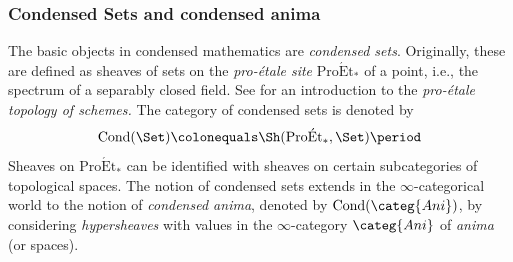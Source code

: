\documentclass[leqno]{article}
\newcommand{\Ani}{\categ{Ani}}
\DeclareMathOperator{\Cond}{Cond}
\newcommand{\CondAni}{\Cond(\Ani)}
\newcommand{\CondSet}{\Cond(\Set)}
\newcommand{\Comp}{\categ{Comp}}
\DeclareMathOperator{\FinSet}{\Set_{\fin}}
\DeclareMathOperator{\ProFin}{\Pro(\FinSet)}
\newcommand{\Extr}{\categ{Extr}}
\newcommand{\ProEt}[1]{\mathrm{Pro\acute{E}t}_{#1}}
\begin{document}
\subsubsection{Condensed Sets and condensed anima}
%
The basic objects in condensed mathematics are \textit{condensed sets}. Originally, these are defined as sheaves of sets on the \textit{pro-\'{e}tale site} $\ProEt{*}$ of a point, i.e., the spectrum of a separably closed field. See \cite{MR3379634} for an introduction to the \textit{pro-\'etale topology of schemes.} The category of condensed sets is denoted by $$\CondSet \colonequals \Sh(\ProEt{*},\Set) \period$$
Sheaves on $\ProEt{*}$ can be identified with sheaves on certain subcategories of topological spaces. The notion of condensed sets extends in the $\infty$-categorical world to the notion of \textit{condensed anima}, denoted by $\CondAni$, by considering \textit{hypersheaves} with values in the $\infty$-category $\Ani$ of \textit{anima} (or spaces).
%
%
\end{document}
